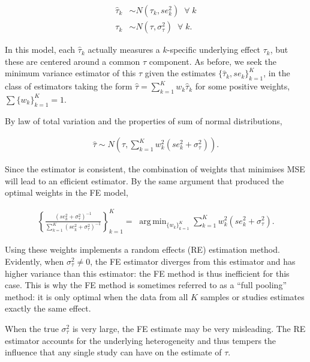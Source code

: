 \documentclass[12pt]{article}
\DeclareMathOperator*{\argmin}{arg\,min}
\begin{document}
\begin{equation}\label{rubin}
\begin{aligned}
\hat{\tau}_k &\sim N(\tau_k, se^2_{k}) \; \; \forall \;k\\
\tau_k &\sim N(\tau, \sigma^2_{\tau}) \; \; \forall\; k.
\end{aligned}
\end{equation}

In this model, each $\hat{\tau}_k$ actually measures a $k$-specific underlying effect $\tau_k$, but these are centered around a common $\tau$ component. As before, we seek the minimum variance estimator of this $\tau$ given the estimates $\{\hat{\tau}_k, se_k\}_{k=1}^K$, in the class of estimators taking the form  $\hat{\tau} = \sum_{k=1}^{K} w_k \hat{\tau}_k$ for some positive weights, $\sum \{w_k\}_{k=1}^K =1$. 

By law of total variation and the properties of sum of normal distributions,

\begin{equation}
\begin{aligned}
\hat{\tau} \sim N(\tau, \sum_{k=1}^{K} w_k^2( se^2_{k} + \sigma^2_{\tau})).
\end{aligned}
\end{equation}

Since the estimator is consistent, the combination of weights that minimises MSE will lead to an efficient estimator. By the same argument that produced the optimal weights in the FE model, 

 \begin{equation}\label{efficient}
\begin{aligned}
\left\{ \frac{(se^2_k+ \sigma^2_{\tau})^{-1}}{\sum_{k=1}^K(se^2_k+ \sigma^2_{\tau})^{-1}} \right\}_{k=1}^K = \; \argmin_{ \{w_k\}_{k=1}^K  } \sum_{k=1}^{K} w_k^2 (se^2_{k}+ \sigma^2_{\tau}).
\end{aligned}
\end{equation}

Using these weights implements a random effects (RE) estimation method. Evidently, when $\sigma^2_{\tau} \neq 0$, the FE estimator diverges from this estimator and has higher variance than this estimator: the FE method is thus inefficient for this case. This is why the FE method is sometimes referred to as a ``full pooling'' method: it is only optimal when the data from all $K$ samples or studies estimates exactly the same effect. 

When the true $\sigma^2_{\tau}$ is very large, the FE estimate may be very misleading. 
The RE estimator accounts for the underlying heterogeneity and thus tempers the influence that any single study can have on the estimate of $\tau$.
\end{document}
